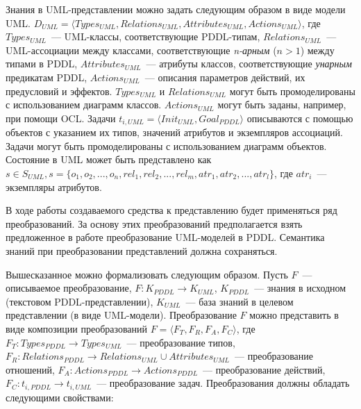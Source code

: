 \documentclass[a4paper,14pt]{extreport}
\begin{document}
    Знания в UML-представлении можно задать следующим образом в виде модели UML.
  $D_{UML} = \langle Types_{UML}, Relations_{UML}, Attributes_{UML}, Actions_{UML} \rangle$, где $Types_{UML}$~--- UML-классы, соответствующие PDDL-типам, $Relations_{UML}$~--- UML-ассоциации между классами, соответствующие \textit{n-арным} ($n > 1$) между типами в PDDL, $Attributes_{UML}$~--- атрибуты классов, соответствующие \textit{унарным} предикатам PDDL, $Actions_{UML}$~--- описания параметров действий, их предусловий и эффектов.
 $Types_{UML}$ и $Relations_{UML}$ могут быть промоделированы с использованием диаграмм классов.
 $Actions_{UML}$ могут быть заданы, например, при помощи OCL.
 Задачи  $t_{i, UML} = \langle Init_{UML}, Goal_{PDDL} \rangle$ описываются с помощью объектов с указанием их типов, значений атрибутов и экземпляров ассоциаций.
 Задачи могут быть промоделированы с использованием диаграмм объектов.
 Состояние в UML может быть представлено как $ s \in S_{UML}, s = \{o_1, o_2, ..., o_n, rel_1, rel_2, ..., rel_m, atr_1, atr_2, ..., atr_l\}$, где $atr_i$~--- экземпляры атрибутов.
    
    В ходе работы создаваемого средства к представлению будет применяться ряд преобразований.
  За основу этих преобразований предполагается взять предложенное в работе \cite{mal-manz} преобразование UML-моделей в PDDL.
 Семантика знаний при преобразовании представлений должна сохраняться.
     
    Вышесказанное можно формализовать следующим образом.
 Пусть $F$~--- описываемое преобразование, $F: K_{PDDL} \to K_{UML}$, $K_{PDDL}$~--- знания в исходном (текстовом PDDL-представлении), $K_{UML}$~--- база знаний в целевом представлении (в виде UML-модели).
 Преобразование $F$ можно представить в виде композиции преобразований $F = \langle F_T, F_R, F_A, F_C \rangle$, где $F_T: Types_{PDDL} \rightarrow Types_{UML}$~--- преобразование типов, $F_R: Relations_{PDDL} \rightarrow Relations_{UML} \cup Attributes_{UML}$~--- преобразование отношений, $F_A: Actions_{PDDL} \rightarrow Actions_{PDDL}$~--- преобразование действий, $F_C: t_{i, PDDL} \rightarrow t_{i, UML}$~--- преобразование задач.
 Преобразования должны обладать следующими свойствами:
    
\end{document}
